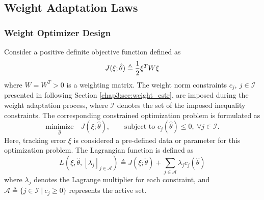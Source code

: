 \subsection{Weight Adaptation Laws} \label{chap3:sec:weight_adap}

\subsubsection{Weight Optimizer Design}

Consider a positive definite objective function defined as 
\begin{equation}
    J(\xi;\hat\theta)\triangleq 
    {1\over 2} \xi^T   W\xi
\end{equation}
where $W=W^T  >0$ is a weighting matrix.
The weight norm constraints $c_j,\ j\in\mathcal{I}$ presented in following Section \ref{chap3:sec:weight_cstr}, are imposed during the weight adaptation process, where $\mathcal I$ denotes the set of the imposed inequality constraints.
The corresponding constrained optimization problem is formulated as
\begin{equation}
    \underset{\hat\theta}{\text{minimize}}\quad J(\xi;\hat\theta),
    \quad\quad
    \text{subject to }
    c_{j}(\hat\theta)\le0, \  \forall j\in\mathcal{I}
    . 
    \label{chap3:eq:train_obj}
\end{equation}
Here, tracking error $\xi$ is considered a pre-defined data or parameter for this optimization problem. The Lagrangian function is defined as
\begin{equation}
    L(\xi,\hat\theta,[\lambda_j]_{j\in\mathcal A}) \triangleq J(\xi;\hat\theta) + 
    \sum_{j\in\mathcal A}
    \lambda_{j}
    c_{j}(\hat\theta)
\end{equation}
where $\lambda_j$ denotes the Lagrange multiplier for each constraint, and $\mathcal A \triangleq \{j\in\mathcal I\ |\ c_j\ge 0\}$ represents the active set.

